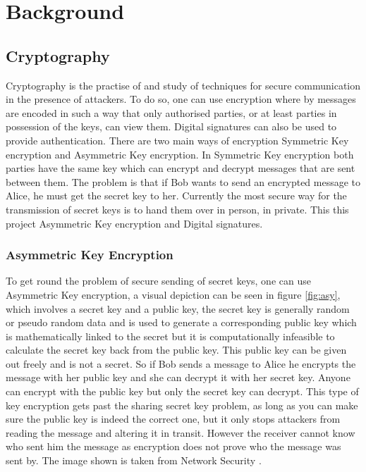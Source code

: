 
\chapter{Background}
\label{back}

\section{Cryptography}

Cryptography is the practise of and study of techniques for secure communication in the presence of attackers. To do so, one can use encryption where by messages are encoded in such a way that only authorised parties, or at least parties in possession of the keys, can view them. Digital signatures can also be used to provide authentication. There are two main ways of encryption Symmetric Key encryption and Asymmetric Key encryption. In Symmetric Key encryption both parties have the same key which can encrypt and decrypt messages that are sent between them. The problem is that if Bob wants to send an encrypted message to Alice, he must get the secret key to her. Currently the most secure way for the transmission of secret keys is to hand them over in person, in private. This this project Asymmetric Key encryption and Digital signatures.


\subsection{Asymmetric Key Encryption}

To get round the problem of secure sending of secret keys, one can use Asymmetric Key encryption, a visual depiction can be seen in figure \ref{fig:asy}, which involves a secret key and a public key, the secret key is generally random or pseudo random data and is used to generate a corresponding public key which is mathematically linked to the secret but it is computationally infeasible to calculate the secret key back from the public key. This public key can be given out freely and is not a secret. So if Bob sends a message to Alice he encrypts the message with her public key and she can decrypt it with her secret key. Anyone can encrypt with the public key but only the secret key can decrypt. This type of key encryption gets past the sharing secret key problem, as long as you can make sure the public key is indeed the correct one, but it only stops attackers from reading the message and altering it in transit. However the receiver cannot know who sent him the message as encryption does not prove who the message was sent by. The image shown is taken from Network Security \cite{NetworkSec}.


